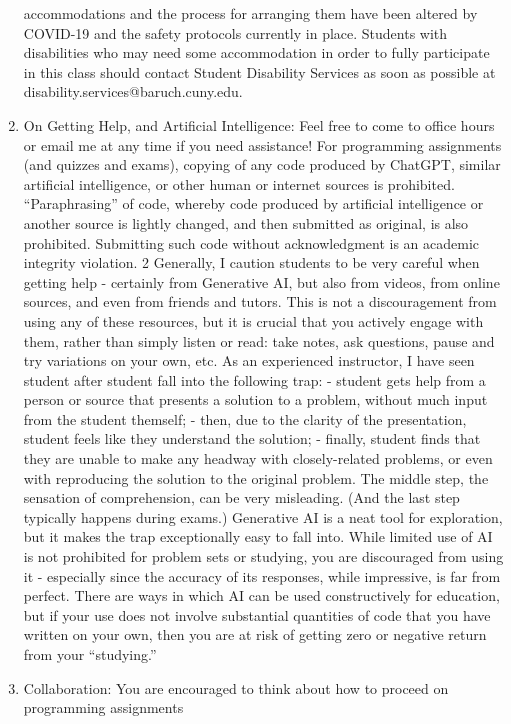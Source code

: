 \documentclass[a4paper]{article}
\begin{document}
\begin{enumerate}
    accommodations and the process for arranging them have been altered by COVID-19 and the
    safety protocols currently in place. Students with disabilities who may need some
    accommodation in order to fully participate in this class should contact Student Disability
    Services as soon as possible at disability.services@baruch.cuny.edu.
    \item On Getting Help, and Artificial Intelligence: Feel free to come to office hours or email me at any
    time if you need assistance!
    For programming assignments (and quizzes and exams), copying of any code produced by
    ChatGPT, similar artificial intelligence, or other human or internet sources is prohibited.
    “Paraphrasing” of code, whereby code produced by artificial intelligence or another source is
    lightly changed, and then submitted as original, is also prohibited. Submitting such code
    without acknowledgment is an academic integrity violation.
    2
    Generally, I caution students to be very careful when getting help - certainly from Generative
    AI, but also from videos, from online sources, and even from friends and tutors. This is not a
    discouragement from using any of these resources, but it is crucial that you actively engage with
    them, rather than simply listen or read: take notes, ask questions, pause and try variations on
    your own, etc. As an experienced instructor, I have seen student after student fall into the
    following trap:
    - student gets help from a person or source that presents a solution to a problem, without much
    input from the student themself;
    - then, due to the clarity of the presentation, student feels like they understand the solution;
    - finally, student finds that they are unable to make any headway with closely-related problems,
    or even with reproducing the solution to the original problem.
    The middle step, the sensation of comprehension, can be very misleading. (And the last step
    typically happens during exams.)
    Generative AI is a neat tool for exploration, but it makes the trap exceptionally easy to fall into.
    While limited use of AI is not prohibited for problem sets or studying, you are discouraged from
    using it - especially since the accuracy of its responses, while impressive, is far from perfect.
    There are ways in which AI can be used constructively for education, but if your use does not
    involve substantial quantities of code that you have written on your own, then you are at risk of
    getting zero or negative return from your “studying.”
    \item Collaboration: You are encouraged to think about how to proceed on programming assignments

\end{enumerate}
\end{document}
